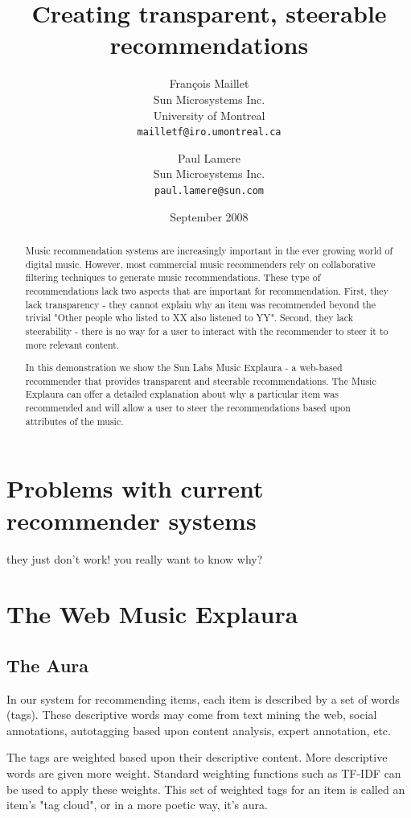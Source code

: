 \documentclass[a4paper,10pt,twocolumn]{article}
\title{Creating transparent, steerable recommendations}
\author{
Fran\c{c}ois Maillet\\
Sun Microsystems Inc.\\
University of Montreal\\
\texttt{mailletf@iro.umontreal.ca}
\and 
Paul Lamere \\
Sun Microsystems Inc.\\
\texttt{paul.lamere@sun.com}
}
\date{September 2008}
\begin{document}
\maketitle

\begin{abstract}

Music recommendation systems are increasingly important in the ever 
    growing world of digital music.  However, most commercial music 
    recommenders rely on collaborative filtering techniques to generate 
    music recommendations. These type of recommendations lack two aspects 
    that are important for recommendation.  First, they lack transparency 
    - they cannot explain why an item was recommended beyond the trivial 
    "Other people who listed to XX also listened to YY". Second, they 
    lack steerability - there is no way for a user to interact with the 
    recommender to steer it to more relevant content.
    
    In this demonstration we show the Sun Labs Music Explaura - a 
    web-based recommender that provides transparent and steerable 
    recommendations. The Music Explaura can offer a detailed explanation 
    about why a particular item was recommended and will allow a user to 
    steer the recommendations based upon attributes of the music.

\end{abstract}

\section{Problems with current recommender systems}

they just don't work! you really want to know why?

\section{The Web Music Explaura}

\subsection{The Aura}

In our system for recommending items, each item is
described by a set of words (tags).  These
descriptive words may come from text mining the
web, social annotations, autotagging based upon
content analysis, expert annotation, etc.

The tags are weighted based upon their descriptive
content. More descriptive words are given more
weight.  Standard weighting functions such as
TF-IDF can be used to apply these weights.  This
set of weighted tags for an item is called an
item's "tag cloud", or in a more poetic way, it's aura.
\end{document}
